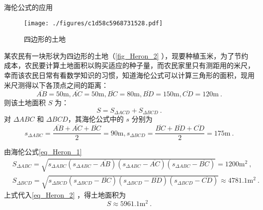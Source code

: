 \begin{example}{海伦公式的应用}
\begin{figure}[ht]
\centering
\texttt{[image: ./figures/c1d58c5968731528.pdf]}
\caption{四边形的土地}\label{fig_Heron_2}
\end{figure}
某农民有一块形状为四边形的土地（\autoref{fig_Heron_2} ），现要种植玉米，为了节约成本，农民要计算土地面积以购买适应的种子量，而农民家里只有测距用的米尺，幸而该农民日常有看数学知识的习惯，知道海伦公式可以计算三角形的面积，现用米尺测得以下各顶点之间的距离：
\begin{equation}
\overline{AB}=50\mathrm{m},\overline{AC}=50\mathrm{m},\overline{BC}=80\mathrm{m},\overline{BD}=150\mathrm{m},\overline{CD}=120\mathrm{m}~.
\end{equation}
则该土地面积 $S$ 为：
\begin{equation}\label{eq_Heron_2}
S=S_{\Delta ACD}+S_{\Delta BCD}~.
\end{equation}
对 $\Delta ABC$ 和 $\Delta BCD$，其海伦公式中的 $s$ 分别为
\begin{equation}
s_{\Delta ABC}=\frac{\overline{AB}+\overline{AC}+\overline{BC}}{2}=90\mathrm{m}
,
s_{\Delta BCD}=\frac{\overline{BC}+\overline{BD}+\overline{CD}}{2}=175\mathrm{m}~.
\end{equation}


由海伦公式\autoref{eq_Heron_1} 
\begin{equation}
\begin{aligned}
&S_{\Delta ABC}=\sqrt{s_{\Delta ABC}(s_{\Delta ABC}-\overline{AB})(s_{\Delta ABC}-\overline{AC})(s_{\Delta ABC}-\overline{BC})}=1200\mathrm{m^2}~,
\\
&S_{\Delta BCD}=\sqrt{s_{\Delta BCD}(s_{\Delta BCD}-\overline{BC})(s_{\Delta BCD}-\overline{BD})(s_{\Delta BCD}-\overline{CD})}\approx 4781.1\mathrm{m^2}~.
\end{aligned}
\end{equation}
上式代入\autoref{eq_Heron_2} ，得土地面积为
\begin{equation}
S\approx 5961.1\mathrm{m^2}~.
\end{equation}
\end{example}

